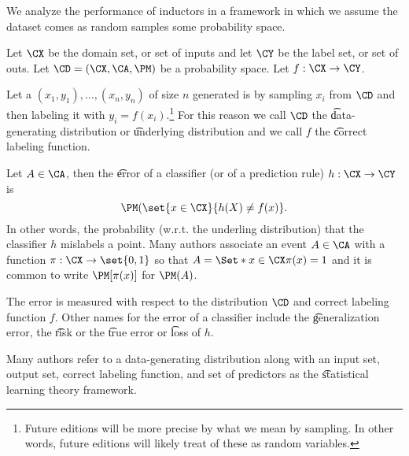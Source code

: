 

We analyze the performance of inductors in a framework in which we assume the dataset comes as random samples some probability space.


Let $\CX$ be the domain set, or set of inputs and let $\CY$ be the label set, or set of outs.
Let $\CD = (\CX, \CA, \PM)$ be a probability space.
Let $f: \CX \to \CY$.

Let a $(x_1, y_1), \dots, (x_n, y_n)$ of size $n$ generated is by sampling $x_i$ from $\CD$ and then labeling it with $y_i = f(x_i)$.\footnote{Future editions will be more precise by what we mean by sampling. In other words, future editions will likely treat of these  as random variables.}
For this reason we call $\CD$ the \t{data-generating distribution} or \t{underlying distribution} and we call $f$ the \t{correct labeling function}.


Let $A \in \CA$, then the \t{error of a classifier} (or of a prediction rule) $h: \CX \to \CY$ is
\[
  \PM(\set{x \in \CX}{h(X) \neq f(x)}.
\]
In other words, the probability (w.r.t. the underling distribution) that the classifier $h$ mislabels a point.
Many authors associate an event $A \in \CA$ with a function $\pi: \CX \to \set{0, 1}$ so that $A = \Set*{x \in \CX}{\pi(x) = 1}$ and it is common to write $\PM[\pi(x)]$ for $\PM(A)$.

The error is measured with respect to the distribution $\CD$ and correct labeling function $f$.
Other names for the error of a classifier include the \t{generalization error}, the \t{risk} or the \t{true error} or \t{loss} of $h$.


Many authors refer to a data-generating distribution along with an input set, output set, correct labeling function, and set of predictors as the \t{statistical learning theory framework}.


\blankpage
